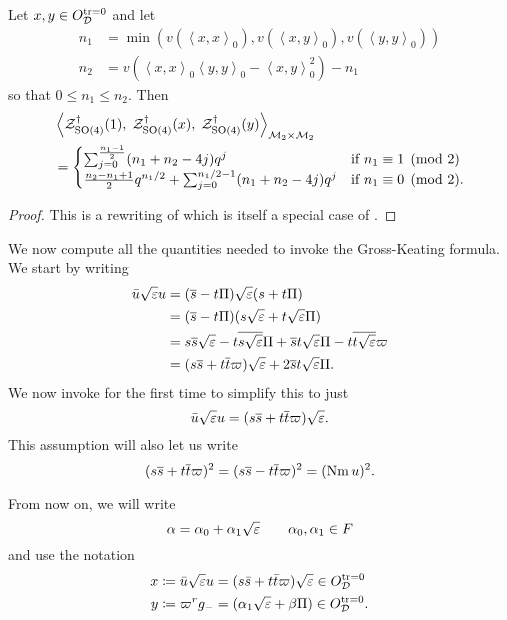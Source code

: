 \begin{proposition}
  \label{prop:GK}
  Let $x,y \in O_\mathcal D^{\operatorname{tr} = 0}$ and let
  \begin{align*}
    n_1 &= \min\left( v(\left\langle x,x \right\rangle _0), v(\left\langle x,y \right\rangle _0), v(\left\langle y,y \right\rangle _0) \right) \\
    n_2 &= v\left( \left\langle x,x \right\rangle _0 \left\langle y,y \right\rangle _0 - \left\langle x,y \right\rangle^2_0 \right) - n_1
  \end{align*}
  so that $0 \le n_1 \le n_2$.
  Then
  \begin{align*}
    &\left< \mathcal Z^{\dagger}_{\operatorname{SO}(4)}(1), \; \mathcal Z^{\dagger}_{\operatorname{SO}(4)}(x), \; \mathcal Z^{\dagger}_{\operatorname{SO}(4)}(y) \right>_{\mathcal M_2 \times \mathcal M_2} \\
    &=
    \begin{cases}
      \sum_{j=0}^{\frac{n_1-1}{2}} (n_1+n_2-4j) q^j & \text{if } n_1 \equiv 1 \pmod 2 \\
      \frac{n_2-n_1+1}{2} q^{n_1/2} + \sum_{j=0}^{n_1/2-1} (n_1+n_2-4j) q^j & \text{if } n_1 \equiv 0 \pmod 2.
    \end{cases}
  \end{align*}
\end{proposition}
\begin{proof}
  This is a rewriting of \cite[Proposition 14.6]{ref:Kudla1997}
  which is itself a special case of \cite[Proposition 5.4]{ref:GK}.
\end{proof}

We now compute all the quantities needed to invoke the Gross-Keating formula.
We start by writing
\begin{align*}
  \bar u \sqrt{\varepsilon} u
  &= (\overline s - t \Pi) \sqrt{\varepsilon} (s + t \Pi) \\
  &= (\overline s - t \Pi) (s \sqrt{\varepsilon} + t \sqrt{\varepsilon} \Pi) \\
  &= s \overline s \sqrt{\varepsilon} - t \overline{s\sqrt{\varepsilon}} \Pi + \overline s t \sqrt{\varepsilon} \Pi - t \overline{t \sqrt{\varepsilon}} \varpi \\
  &= (s \overline s + t \overline t \varpi) \sqrt{\varepsilon} + 2 \overline s t \sqrt{\varepsilon} \Pi.
\end{align*}
We now invoke  for the first time to simplify this to just
\[ \bar u \sqrt{\varepsilon} u = (s \overline s + t \overline t \varpi) \sqrt{\varepsilon}. \]
This assumption will also let us write
\[ (s \overline s + t \overline t \varpi)^2 = (s \overline s - t \overline t \varpi)^2 = (\operatorname{Nm} u)^2. \]

From now on, we will write
\[ \alpha = \alpha_0 + \alpha_1 \sqrt{\varepsilon} \qquad \alpha_0, \alpha_1 \in F \]
and use the notation
\begin{align*}
  x &\coloneqq \bar u \sqrt{\varepsilon} u = (s \bar s + t \bar t \varpi) \sqrt{\varepsilon} \in O_\mathcal D^{\operatorname{tr} = 0} \\
  y &\coloneqq \varpi^r g_- = (\alpha_1\sqrt{\varepsilon} + \beta \Pi) \in O_\mathcal D^{\operatorname{tr} = 0}.
\end{align*}

